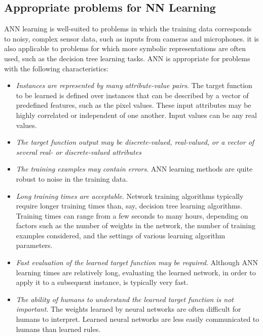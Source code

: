 \documentclass[../main.tex]{subfiles}
\begin{document}
\subsection{Appropriate problems for NN Learning}
ANN learning is well-suited to problems in which the training data corresponds to noisy, complex sensor data, such as inputs from cameras and microphones.
it is also applicable to problems for which more symbolic representations are often used, such as the decision tree learning tasks. ANN is appropriate for problems with the following characteristics:
\begin{itemize}
    \item\textit{Instances are represented by many attribute-value pairs}. The target function to be learned is defined over instances that can be described by a vector of predefined features, such as the pixel values. These input attributes may be highly correlated or independent of one another. Input values can be any real values.
    
    \item \textit{The target function output may be discrete-valued, real-valued, or a vector of several real- or discrete-valued attributes} 
    
    \item \textit{The training examples may contain errors}. ANN learning methods are quite robust to noise in the training data.
    
    \item \textit{Long training times are acceptable}. Network training algorithms typically require longer training times than, say, decision tree learning algorithms. Training times can range from a few seconds to many hours, depending on factors such as the number of weights in the network, the number of training examples considered, and the settings of various learning algorithm parameters.
    
    \item \textit{Fast evaluation of the learned target function may be required}. Although ANN learning times are relatively long, evaluating the learned network, in order to apply it to a subsequent instance, is typically very fast. 
    
    \item \textit{The ability of humans to understand the learned target function is not important}. The weights learned by neural networks are often difficult for humans to interpret. Learned neural networks are less easily communicated to humans than learned rules.
\end{itemize}
\end{document}
